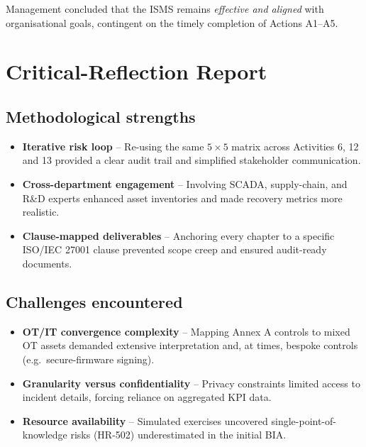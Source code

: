 Management concluded that the \ac{ISMS} remains
\emph{effective and aligned} with organisational goals, contingent on the
timely completion of Actions A1–A5.

\section{Critical-Reflection Report}
\label{sec:critical_reflection}

\subsection{Methodological strengths}

\begin{itemize}
  \item \textbf{Iterative risk loop} – Re-using the same
        $5\times5$ matrix across Activities 6, 12 and 13 provided a clear
        audit trail and simplified stakeholder communication.
  \item \textbf{Cross-department engagement} – Involving SCADA, supply-chain,
        and R\&D experts enhanced asset inventories and made recovery
        metrics more realistic.
  \item \textbf{Clause-mapped deliverables} – Anchoring every chapter to a
        specific ISO/IEC 27001 clause prevented scope creep and ensured
        audit-ready documents.
\end{itemize}

\subsection{Challenges encountered}

\begin{itemize}
  \item \textbf{OT/IT convergence complexity} – Mapping Annex A controls
        to mixed OT assets demanded extensive interpretation and, at times,
        bespoke controls (e.g.\ secure-firmware signing).
  \item \textbf{Granularity versus confidentiality} – Privacy constraints
        limited access to incident details, forcing reliance on aggregated
        KPI data.
  \item \textbf{Resource availability} – Simulated exercises uncovered
        single-point-of-knowledge risks (HR-502) underestimated in the
        initial BIA.
\end{itemize}

